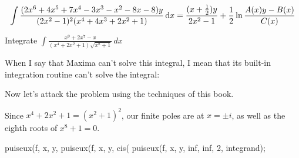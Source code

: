$$\int {{(2x^6+4x^5+7x^4-3x^3-x^2-8x-8)y}\over{(2x^2-1)^2(x^4+4 x^3+2 x^2+1)}} \,{\rm d}x
= {{(x+{1\over2})y}\over{2x^2-1}} + {1\over2}\ln{{A(x)y - B(x)}\over{C(x)}}
$$


\endexample

\vfill\eject
{}

\example
\label{an integral Maxima can't solve}
Integrate $\int \frac{x^9+2x^7-x}{(x^4+2x^2+1)\sqrt{x^8+1}}\, dx$

When I say that Maxima can't solve this integral, I mean that its
built-in integration routine can't solve the integral:


Now let's attack the problem using the techniques of this book.

Since $x^4+2x^2+1=(x^2+1)^2$, our finite poles are at $x=\pm i$,
as well as the eighth roots of $x^8+1=0$.

\begin{maximablock}
puiseux(f, x, y, %
puiseux(f, x, y, cis(%
puiseux(f, x, y, inf, inf, 2, integrand);
\end{maximablock}

\endexample

